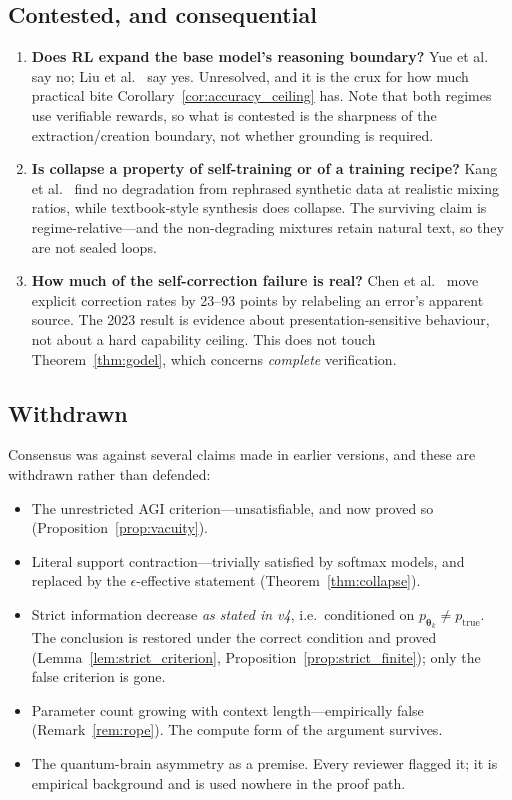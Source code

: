 \documentclass[11pt,a4paper]{article}
\begin{document}
\subsection{Contested, and consequential}
\label{sec:contested}

\begin{enumerate}
    \item \textbf{Does RL expand the base model's reasoning boundary?} Yue et al.~\cite{yue2025rlvr} say no; Liu et al.~\cite{liu2025prorl} say yes. Unresolved, and it is the crux for how much practical bite Corollary~\ref{cor:accuracy_ceiling} has. Note that both regimes use verifiable rewards, so what is contested is the sharpness of the extraction/creation boundary, not whether grounding is required.
    \item \textbf{Is collapse a property of self-training or of a training recipe?} Kang et al.~\cite{kang2025demystifying} find no degradation from rephrased synthetic data at realistic mixing ratios, while textbook-style synthesis does collapse. The surviving claim is regime-relative---and the non-degrading mixtures retain natural text, so they are not sealed loops.
    \item \textbf{How much of the self-correction failure is real?} Chen et al.~\cite{chen2026selfcorrection} move explicit correction rates by 23--93 points by relabeling an error's apparent source. The 2023 result is evidence about presentation-sensitive behaviour, not about a hard capability ceiling. This does not touch Theorem~\ref{thm:godel}, which concerns \emph{complete} verification.
\end{enumerate}

\subsection{Withdrawn}

Consensus was against several claims made in earlier versions, and these are withdrawn rather than defended:

\begin{itemize}
    \item The unrestricted AGI criterion---unsatisfiable, and now proved so (Proposition~\ref{prop:vacuity}).
    \item Literal support contraction---trivially satisfied by softmax models, and replaced by the $\epsilon$-effective statement (Theorem~\ref{thm:collapse}).
    \item Strict information decrease \emph{as stated in v4}, i.e.\ conditioned on $p_{\bm{\theta}_k} \neq p_{\mathrm{true}}$. The conclusion is restored under the correct condition and proved (Lemma~\ref{lem:strict_criterion}, Proposition~\ref{prop:strict_finite}); only the false criterion is gone.
    \item Parameter count growing with context length---empirically false (Remark~\ref{rem:rope}). The compute form of the argument survives.
    \item The quantum-brain asymmetry as a premise. Every reviewer flagged it; it is empirical background and is used nowhere in the proof path.
\end{itemize}
\end{document}
